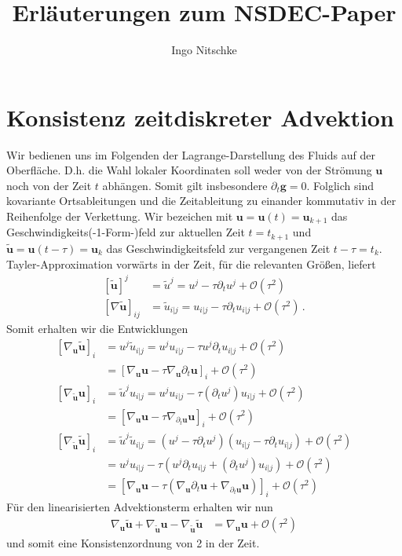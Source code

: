 \documentclass[a4paper,11pt]{scrartcl}
\title{Erläuterungen zum NSDEC-Paper}
\author{Ingo Nitschke}
\newcommand{\U}{u} %
\newcommand{\Ub}{\mathbf{\U}} %
\newcommand{\tU}{\tilde{u}} %
\newcommand{\tUb}{\mathbf{\tU}} %
\newcommand{\g}{\mathbf{g}} %
\newcommand{\landau}{\mathcal{O}}
\newcommand{\formPeriod}{\,\text{.}}
\begin{document}
\maketitle

\section{Konsistenz zeitdiskreter Advektion}

Wir bedienen uns im Folgenden der Lagrange-Darstellung des Fluids auf der Oberfläche.
D.h. die Wahl lokaler Koordinaten soll weder von der Strömung \( \Ub \) noch von der Zeit \( t \) abhängen.
Somit gilt insbesondere \( \partial_{t}\g = 0 \).
Folglich sind kovariante Ortsableitungen und die Zeitableitung zu einander kommutativ in der Reihenfolge der Verkettung.
Wir bezeichen mit \( \Ub = \Ub(t) = \Ub_{k+1} \) das Geschwindigkeits(-1-Form-)feld zur aktuellen Zeit \( t =t_{k+1}\)
und \( \tUb = \Ub(t-\tau) =\Ub_{k}\) das Geschwindigkeitsfeld zur vergangenen Zeit \( t-\tau = t_{k} \).
Tayler-Approximation vorwärts in der Zeit, für die relevanten Größen, liefert
\begin{align}
  \left[ \tUb \right]^{j} &= \tU^{j} = \U^{j} - \tau\partial_{t}\U^{j} + \landau\left( \tau^{2} \right) \\
  \left[ \nabla\tUb \right]_{ij} &= \tU_{i|j} = \U_{i|j} - \tau\partial_{t}\U_{i|j} + \landau\left( \tau^{2} \right) \formPeriod
\end{align}
Somit erhalten wir die Entwicklungen
\begin{align}
  \left[ \nabla_{\Ub}\tUb \right]_{i}
        &=\U^{j}\tU_{i|j} = \U^{j}\U_{i|j} - \tau\U^{j}\partial_{t}\U_{i|j} + \landau\left( \tau^{2} \right) \\
        &= \left[ \nabla_{\Ub}\Ub - \tau\nabla_{\Ub}\partial_{t}\Ub \right]_{i} + \landau\left( \tau^{2} \right) \\
  \left[ \nabla_{\tUb}\Ub \right]_{i}
        &= \tU^{j}\U_{i|j} = \U^{j}\U_{i|j} - \tau\left(\partial_{t}\U^{j}\right)\U_{i|j} + \landau\left( \tau^{2} \right) \\
        &= \left[ \nabla_{\Ub}\Ub - \tau\nabla_{\partial_{t}\Ub}\Ub \right]_{i} + \landau\left( \tau^{2} \right) \\
  \left[ \nabla_{\tUb}\tUb \right]_{i}
        &= \tU^{j}\tU_{i|j} = \left( \U^{j} - \tau\partial_{t}\U^{j} \right)\left(  \U_{i|j} - \tau\partial_{t}\U_{i|j} \right) + \landau\left( \tau^{2} \right)\\
        &= \U^{j}\U_{i|j} - \tau \left( \U^{j}\partial_{t}\U_{i|j} + \left(\partial_{t}\U^{j}\right)\U_{i|j} \right) + \landau\left( \tau^{2} \right) \\
        &= \left[ \nabla_{\Ub}\Ub - \tau \left( \nabla_{\Ub}\partial_{t}\Ub + \nabla_{\partial_{t}\Ub}\Ub \right) \right]_{i} + \landau\left( \tau^{2} \right)
\end{align}
Für den linearisierten Advektionsterm erhalten wir nun
\begin{align}\label{eq:adlin}
  \nabla_{\Ub}\tUb + \nabla_{\tUb}\Ub - \nabla_{\tUb}\tUb 
        &=  \nabla_{\Ub}\Ub + \landau\left( \tau^{2} \right)
\end{align}
und somit eine Konsistenzordnung von 2 in der Zeit.
\end{document}
